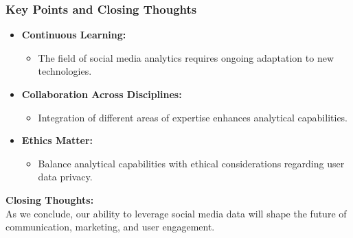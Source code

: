 \documentclass{beamer}
\begin{document}
\begin{frame}[fragile]
    \frametitle{Key Points and Closing Thoughts}
    
    \begin{itemize}
        \item \textbf{Continuous Learning:} 
        \begin{itemize}
            \item The field of social media analytics requires ongoing adaptation to new technologies.
        \end{itemize}
        
        \item \textbf{Collaboration Across Disciplines:}
        \begin{itemize}
            \item Integration of different areas of expertise enhances analytical capabilities.
        \end{itemize}
        
        \item \textbf{Ethics Matter:}
        \begin{itemize}
            \item Balance analytical capabilities with ethical considerations regarding user data privacy.
        \end{itemize}
    \end{itemize}
    
    \textbf{Closing Thoughts:} \\
    As we conclude, our ability to leverage social media data will shape the future of communication, marketing, and user engagement.
\end{frame}
\end{document}
